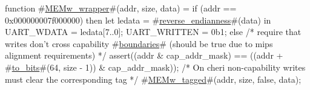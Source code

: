 function #\hyperref[sailMIPSzMEMwzywrapper]{MEMw\_wrapper}#(addr, size, data) =
  if (addr == 0x000000007f000000) then
  {
    let ledata   = #\hyperref[sailMIPSzreversezyendianness]{reverse\_endianness}#(data) in
    UART_WDATA   = ledata[7..0];
    UART_WRITTEN = 0b1;
  }
  else
  {
    /* require that writes don't cross capability #\hyperref[sailMIPSzboundaries]{boundaries}# (should be true due to mips alignment requirements) */
    assert((addr & cap_addr_mask) == ((addr + #\hyperref[sailMIPSztozybits]{to\_bits}#(64, size - 1)) & cap_addr_mask));
    /* On cheri non-capability writes must clear the corresponding tag */
    #\hyperref[sailMIPSzMEMwzytagged]{MEMw\_tagged}#(addr, size, false, data);
  }
